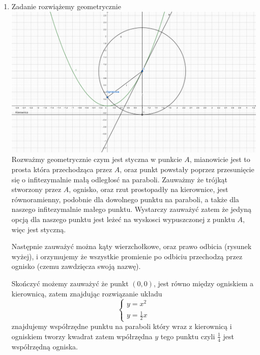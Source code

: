 \documentclass[11pt]{scrartcl}
\begin{document}
    \begin{enumerate}
      \item Zadanie rozwiążemy geometrycznie \\
        \includegraphics[width=\textwidth - 40pt]{parabola} \\
        Rozważmy geometrycznie czym jest styczna w punkcie $A$, mianowicie jest to prosta która przechodząca przez $A$, oraz punkt powstały poprzez przesunięcie się o infitezymalnie małą odległosć na paraboli. Zauważmy że trójkąt stworzony przez $A$, ognisko, oraz rzut prostopadły na kierownice, jest równoramienny, podobnie dla dowolnego punktu na paraboli, a także dla naszego infitezymalnie małego punktu. Wystarczy zauważyć zatem że jedyną opcją dla naszego punktu jest leżeć na wyskosci wypuszczonej z punktu $A$, więc jest styczną.

        Następnie zauważyć można kąty wierzchołkowe, oraz prawo odbicia (rysunek wyżej), i orzymujemy że wszystkie promienie po odbiciu przechodzą przez ognisko (czemu zawdzięcza swoją nazwę).

        Skończyć możemy zauważyć że punkt $\left ( 0, 0 \right )$, jest równo między ogniskiem a kierownicą, zatem znajdując rozwiązanie układu 
        \[
            \begin{cases}
                y = x^2 \\
                y = \frac{1}{2} x
            \end{cases}
        \]
        znajdujemy współrzędne punktu na paraboli który wraz z kierownicą i ogniskiem tworzy kwadrat zatem wpółrzędna $y$ tego punktu czyli $\frac{1}{4}$ jest współrzędną ogniska.
        

\end{enumerate}
\end{document}
